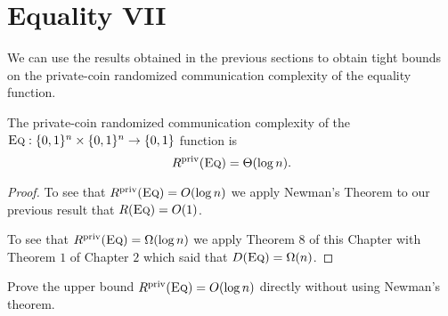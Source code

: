 \newpage 
\section{Equality VII}

We can use the results obtained in the previous sections to obtain tight bounds on the private-coin randomized communication complexity of the equality function.

\begin{theorem}
The private-coin randomized communication complexity of the $\textsc{Eq} : \{0,1\}^n \times \{0,1\}^n \to \{0,1\}$ function is
\[
R^{\mathrm{priv}}(\textsc{Eq}) = \Theta( \log n).
\]
\end{theorem}

\begin{proof}
To see that $R^{\mathrm{priv}}(\textsc{Eq}) = O(\log n)$ we apply Newman's Theorem to our previous result that $R(\textsc{Eq}) = O(1)$.

To see that $R^{\mathrm{priv}}(\textsc{Eq}) = \Omega(\log n)$ we apply Theorem 8 of this Chapter with Theorem $1$ of Chapter $2$ which said that $D(\textsc{Eq}) = \Omega(n)$.
\end{proof}

\exercises

\begin{exercise}
Prove the upper bound $R^{\mathrm{priv}}(\textsc{Eq}) = O( \log n)$ directly without using Newman's theorem.
\end{exercise}
